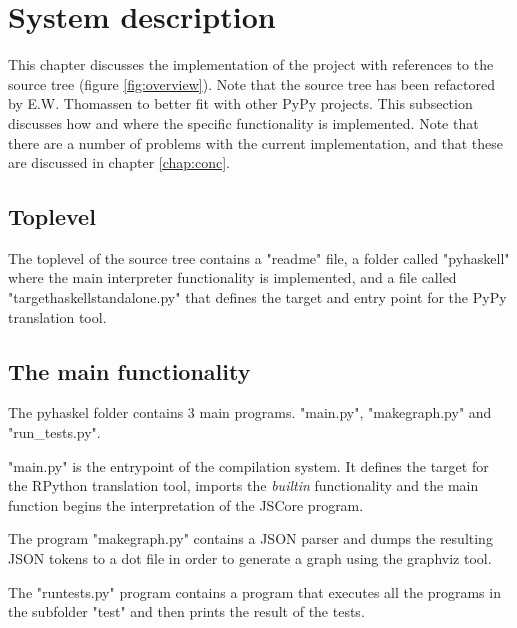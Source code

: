 

\chapter{System description}
\label{chap:impl}

This chapter discusses the implementation of the project with
references to the source tree (figure \ref{fig:overview}).
Note that the source tree has been refactored by E.W. Thomassen
to better fit with other PyPy projects. This subsection discusses how
and where the specific functionality is implemented. Note that there
are a number of problems with the current implementation, and that
these are discussed in chapter \ref{chap:conc}.

\section{Toplevel}

The toplevel of the source tree contains a "readme" file, a folder
called "pyhaskell" where the main interpreter functionality is 
implemented, and a file called "targethaskellstandalone.py" that 
defines the target and entry point for the PyPy translation tool.

\section{The main functionality}

The pyhaskel folder contains 3 main programs. "main.py",
"makegraph.py" and "run\_tests.py".

"main.py" is the entrypoint of the compilation system. It defines
the target for the RPython translation tool, imports the \emph{builtin}
functionality and the main function begins the interpretation of the
JSCore program.

The program "makegraph.py" contains a JSON parser and dumps the resulting
JSON tokens to a dot file in order to generate a graph using the graphviz
tool.

The "runtests.py" program contains a program that executes all the programs
in the subfolder "test" and then prints the result of the tests.

